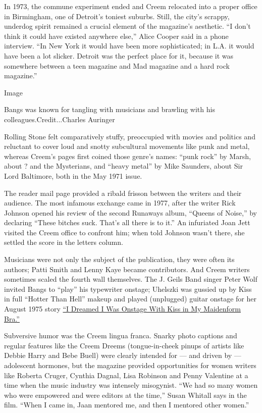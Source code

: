 In 1973, the commune experiment ended and Creem relocated into a proper
office in Birmingham, one of Detroit's toniest suburbs. Still, the
city's scrappy, underdog spirit remained a crucial element of the
magazine's aesthetic. ``I don't think it could have existed anywhere
else,'' Alice Cooper said in a phone interview. ``In New York it would
have been more sophisticated; in L.A. it would have been a lot slicker.
Detroit was the perfect place for it, because it was somewhere between a
teen magazine and Mad magazine and a hard rock magazine.''

Image

Bangs was known for tangling with musicians and brawling with his
colleagues.Credit...Charles Auringer

Rolling Stone felt comparatively stuffy, preoccupied with movies and
politics and reluctant to cover loud and snotty subcultural movements
like punk and metal, whereas Creem's pages first coined those genre's
names: ``punk rock'' by Marsh, about ? and the Mysterians, and ``heavy
metal'' by Mike Saunders, about Sir Lord Baltimore, both in the May 1971
issue.

The reader mail page provided a ribald frisson between the writers and
their audience. The most infamous exchange came in 1977, after the
writer Rick Johnson opened his review of the second Runaways album,
``Queens of Noise,'' by declaring ``These bitches suck. That's all there
is to it.'' An infuriated Joan Jett visited the Creem office to confront
him; when told Johnson wasn't there, she settled the score in the
letters column.

Musicians were not only the subject of the publication, they were often
its authors; Patti Smith and Lenny Kaye became contributors. And Creem
writers sometimes scaled the fourth wall themselves. The J. Geils Band
singer Peter Wolf invited Bangs to ``play'' his typewriter onstage;
Uhelszki was gussied up by Kiss in full ``Hotter Than Hell'' makeup and
played (unplugged) guitar onstage for her August 1975 story
\href{https://iaspm-us.net/rocks-backpages-rewind-jaan-uhelszki-i-dreamed-i-was-onstage-with-kiss-in-my-maidenform-bra-creem-august-1975/}{``I
Dreamed I Was Onstage With Kiss in My Maidenform Bra.''}

Subversive humor was the Creem lingua franca. Snarky photo captions and
regular features like the Creem Dreems (tongue-in-cheek pinups of
artists like Debbie Harry and Bebe Buell) were clearly intended for ---
and driven by --- adolescent hormones, but the magazine provided
opportunities for women writers like Roberta Cruger, Cynthia Dagnal,
Lisa Robinson and Penny Valentine at a time when the music industry was
intensely misogynist. ``We had so many women who were empowered and were
editors at the time,'' Susan Whitall says in the film. ``When I came in,
Jaan mentored me, and then I mentored other women.''

